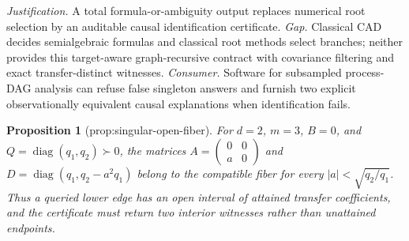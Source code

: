 \documentclass{article}
\newtheorem{proposition}{Proposition}
\begin{document}
\par\smallskip\noindent \textit{Justification.} A total formula-or-ambiguity output replaces numerical root selection by an auditable causal identification certificate. \textit{Gap.} Classical CAD decides semialgebraic formulas and classical root methods select branches; neither provides this target-aware graph-recursive contract with covariance filtering and exact transfer-distinct witnesses. \textit{Consumer.} Software for subsampled process-DAG analysis can refuse false singleton answers and furnish two explicit observationally equivalent causal explanations when identification fails.

\begin{proposition}[prop:singular-open-fiber]\label{prop:singular-open-fiber}
For \(d=2\), \(m=3\), \(B=0\), and \(Q=\operatorname{diag}(q_1,q_2)\succ0\), the matrices \(A=\left(\begin{smallmatrix}0&0\\a&0\end{smallmatrix}\right)\) and \(D=\operatorname{diag}(q_1,q_2-a^2q_1)\) belong to the compatible fiber for every \(|a|<\sqrt{q_2/q_1}\). Thus a queried lower edge has an open interval of attained transfer coefficients, and the certificate must return two interior witnesses rather than unattained endpoints.
\end{proposition}
\end{document}
